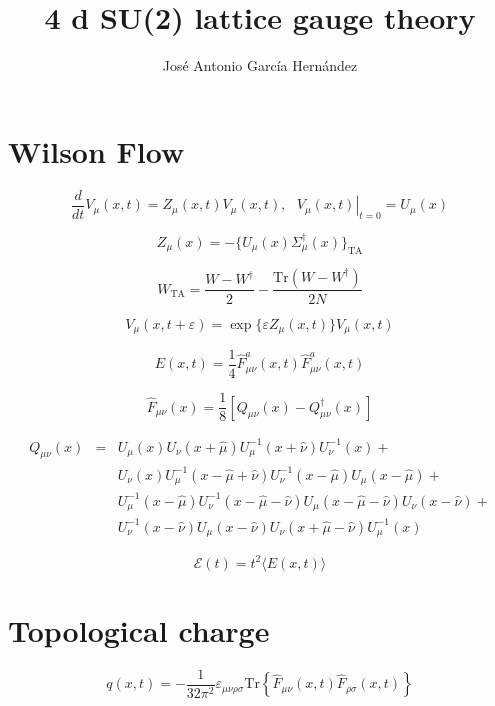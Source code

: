 \documentclass[12pt,a4paper]{article}
\author{José Antonio García Hernández}
\title{4 d SU(2) lattice gauge theory}
\begin{document}
\maketitle
\section{Wilson Flow}
\begin{equation}
    \frac{d}{dt}V_{\mu}(x,t) = Z_{\mu}(x,t)V_{\mu}(x,t) , \ \ \  \left. {V_{\mu}(x,t)}\right|_{t = 0} = U_{\mu}(x)
\end{equation}

\begin{equation}
         Z_{\mu}(x) = -\{U_{\mu}(x)\Sigma_{\mu}^{\dagger}(x)\}_{\text{TA}}
\end{equation}

\begin{equation}
    W_{\text{TA}} = \frac{W - W^{\dagger}}{2} - \frac{\text{Tr} (W - W^{\dagger})}{2N}
\end{equation}

\begin{equation}
    V_{\mu}(x,t+\varepsilon) = \exp\{\varepsilon Z_{\mu}(x,t)\}V_{\mu}(x,t)
\end{equation}

\begin{equation}
    E(x,t) = \frac{1}{4} \hat{F}_{\mu\nu}^a(x,t) \hat{F}_{\mu\nu}^a(x,t)
\end{equation}

\begin{equation}
    \hat{F}_{\mu\nu}(x) = \frac{1}{8}\left[ Q_{\mu\nu}(x) -  Q_{\mu\nu}^{\dagger}(x)\right]
\end{equation}

\begin{eqnarray}
    Q_{\mu\nu}(x) & = & U_{\mu}(x)U_{\nu}(x+\hat{\mu})U_{\mu}^{-1}(x+\hat{\nu})U_{\nu}^{-1}(x)  +  \nonumber\\
    & & U_{\nu}(x)U_{\mu}^{-1}(x-\hat{\mu}+\hat{\nu})U_{\nu}^{-1}(x-\hat{\mu})U_{\mu}(x-\hat{\mu})  + \nonumber\\ 
    & & U_{\mu}^{-1}(x-\hat{\mu})U_{\nu}^{-1}(x-\hat{\mu}-\hat{\nu})U_{\mu}(x-\hat{\mu}-\hat{\nu})U_{\nu}(x-\hat{\nu})+\nonumber\\
    &  & U_{\nu}^{-1}(x-\hat{\nu}) U_{\mu}(x-\hat{\nu})U_{\nu}(x+\hat{\mu}-\hat{\nu})U_{\mu}^{-1}(x)
\end{eqnarray}

\begin{equation}
    \mathcal{E}(t) = t^2 \langle E(x,t)\rangle
\end{equation}

\section{Topological charge}
\begin{equation}
    q(x,t) = -\frac{1}{32\pi^2}\varepsilon_{\mu\nu\rho\sigma} \text{Tr} \left\{ \hat{F}_{\mu\nu}(x,t)\hat{F}_{\rho\sigma}(x,t)\right\}
\end{equation}
\end{document}
